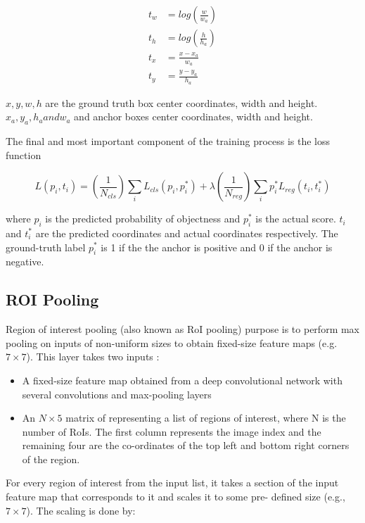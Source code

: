 \begin{align}
  t_{w} &= log(\frac{w}{w_{a}}) \\
  t_{h} &= log(\frac{h}{h_{a}}) \\
  t_{x} &= \frac{x - x_{a}}{w_{a}} \\
  t_{y} &= \frac{y - y_{a}}{h_{a}}
\end{align}

$x, y , w, h$ are the ground truth box center coordinates, width and height. $x_{a}, y_{a}, h_{a} and w_{a}$ and anchor boxes center coordinates, width and height.

The final and most important component of the training process is the loss function

\begin{equation}
  L(p_{i},t_{i}) = (\frac{1}{N_{cls}}) \sum_{i}^{} L_{cls}(p_{i},p_{i}^{*}) + \lambda (\frac{1}{N_{reg}}) \sum_{i}^{} p_{i}^{*} L_{reg}(t_{i},t_{i}^{*})
\end{equation}

where $p_{i}$ is the predicted probability of objectness and $p_{i}^*$ is the actual score. $t_{i}$ and $t_{i}^*$ are the predicted coordinates and actual coordinates respectively. The ground-truth label $p_{i}^*$ is 1 if the the anchor is positive and 0 if the anchor is negative.

\subsection{ROI Pooling}
Region of interest pooling (also known as RoI pooling) purpose is to perform max pooling on inputs of non-uniform sizes to obtain fixed-size feature maps (e.g. $7 \times 7$). This layer takes two inputs :

\begin{itemize}
	\item A fixed-size feature map obtained from a deep convolutional network with several convolutions and max-pooling layers
	\item An $N \times 5$ matrix of representing a list of regions of interest, where N is the number of RoIs. The first column represents the image index and the remaining four are the co-ordinates of the top left and bottom right corners of the region.
\end{itemize}

For every region of interest from the input list, it takes a section of the input feature map that corresponds to it and scales it to some pre-
defined size (e.g., $7 \times 7$). The scaling is done by:

